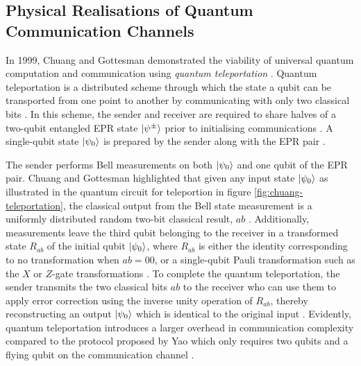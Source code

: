 \subsection{Physical Realisations of Quantum Communication Channels}

In 1999, Chuang and Gottesman demonstrated the viability of universal quantum computation and communication using \textit{quantum teleportation} \cite{gottesman1999demonstrating}. Quantum teleportation is a distributed scheme through which the state a qubit can be transported from one point to another by communicating with only two classical bits \cite{gottesman1999demonstrating}. In this scheme, the sender and receiver are required to share halves of a two-qubit entangled EPR state $\ket{\psi^\pm}$ prior to initialising communications \cite{gottesman1999demonstrating}. A single-qubit state $\ket{\psi_0}$ is prepared by the sender along with the EPR pair \cite{gottesman1999demonstrating}. 

The sender performs Bell measurements on both $\ket{\psi_0}$ and one qubit of the EPR pair. Chuang and Gottesman highlighted that given any input state $\ket{\psi_0}$ as illustrated in the quantum circuit for teleportion in figure \ref{fig:chuang-teleportation}, the classical output from the Bell state measurement is a uniformly distributed random two-bit classical result, $ab$ \cite{gottesman1999demonstrating}. Additionally, measurements leave the third qubit belonging to the receiver in a transformed state $R_{ab}$ of the initial qubit $\ket{\psi_0}$, where $R_{ab}$ is either the identity corresponding to no transformation when $ab = 00$, or a single-qubit Pauli transformation such as the $X$ or $Z$-gate transformations \cite{gottesman1999demonstrating}. To complete the quantum teleportation, the sender transmits the two classical bits $ab$ to the receiver who can use them to apply error correction using the inverse unity operation of $R_{ab}$, thereby reconstructing an output $\ket{\psi_0}$ which is identical to the original input \cite{gottesman1999demonstrating}. Evidently, quantum teleportation introduces a larger overhead in communication complexity compared to the protocol proposed by Yao which only requires two qubits and a flying qubit on the communication channel \cite{DeWolf2019}. 

